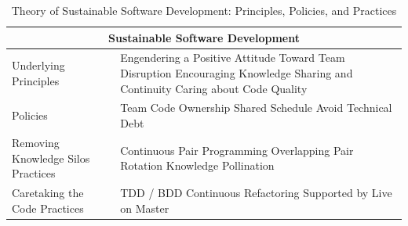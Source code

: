 \begin{table}[t]
\renewcommand{\arraystretch}{1.5}
\centering
\caption{Theory of Sustainable Software Development: Principles, Policies, and Practices}
\label{SustainableSoftwareDevelopmentTableInTeamCodeOwnership}
\begin{tabular}{|p{2.5in}|p{3.5in}|}
\hline
\multicolumn{2}{|c|}{Sustainable Software Development}              
\\
\hline
Underlying Principles & Engendering a Positive Attitude Toward Team Disruption \newline Encouraging Knowledge Sharing and Continuity \newline Caring about Code Quality \\ 
\hline
Policies & Team Code Ownership \newline Shared Schedule \newline Avoid Technical Debt  \\
\hline
Removing Knowledge Silos Practices & Continuous Pair Programming \newline Overlapping Pair Rotation \newline  Knowledge Pollination  \\
\hline
Caretaking the Code Practices & TDD / BDD \newline Continuous Refactoring  \newline Supported by Live on Master \\
\hline
\end{tabular}
\end{table}



